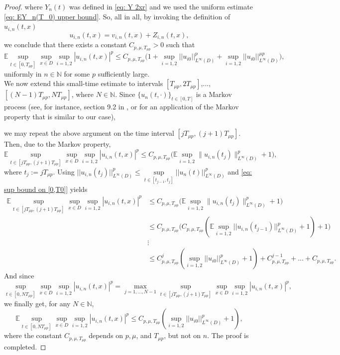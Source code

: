 \documentclass[12pt]{article}
\theoremstyle{definition}
\theoremstyle{remark}
\begin{document}
\begin{proof}
where $Y_n(t)$ was defined in \eqref{eq: Y 2xr} and we used the uniform estimate \eqref{eq: EY_n(T_0) upper bound}. So, all in all, by invoking the definition of $u_{i,n}(t,x)$
\[
u_{i,n}(t,x) = v_{i,n}(t,x) + Z_{i,n}(t,x),
\]
we conclude that there exists a constant $C_{p,\mu,T_{\mu p}}>0$ such that
\begin{equation}\label{eq: sup bound on [0,T0]}
\mathbb E\sup_{t\in [0,T_{\mu p}]}\sup_{x\in D}\sup_{i=1,2} |u_{i,n}(t,x)|^p\leq C_{p,\mu,T_{\mu p}}\Bigg(1+\sup_{i=1,2} ||u_{i0}||^p_{L^{\infty}(D)}+\sup_{i=1,2}||u_{i0}||^{\mu p}_{L^{\infty}(D)}\Bigg),
\end{equation}
uniformly in $n\in \mathbb N$ for some $p$ sufficiently large.\\[1em]
\noindent 
We now extend this small-time estimate to intervals $[T_{\mu p}, 2T_{\mu p}]$,...,$[(N-1)T_{\mu p},NT_{\mu p}]$, where $N\in \mathbb N$. Since $\{u_{n}(t,\cdot)\}_{t\in [0,T]}$ is a Markov process (see, for instance, section 9.2 in \cite{da2014stochastic}, or \cite{cerrai2003stochastic} for an application of the Markov property that is similar to our case), 

we may repeat the above argument on the time interval $[jT_{\mu p},(j+1)T_{\mu p}]$. Then, due to the Markov property,
\begin{equation*}
\mathbb{E}\sup_{t\in [jT_{\mu p},(j+1)T_{\mu p}]}\sup_{x\in D}\sup_{i=1,2}
|u_{i,n}(t,x)|^p
\le
C_{p,\mu,T_{\mu p}}\Big(\mathbb{E}\sup_{i=1,2}\|u_{i,n}(t_j)\|_{L^\infty(D)}^p+1\Big),
\end{equation*}
where $t_j := jT_{\mu p}$. Using $||u_{i,n}(t_j)||^p_{L^{\infty}(D)}\leq \sup\limits_{t\in [t_{j-1},t_{j}]} ||u_n(t)||_{L^{\infty}(D)}^p$ and \eqref{eq: sup bound on [0,T0]} yields
\begin{align*}
\mathbb{E}\sup_{t\in [jT_{\mu p},(j+1)T_{\mu p}]}\sup_{x\in D}\sup_{i=1,2}
|u_{i,n}(t,x)|^p
&\le
C_{p,\mu,T_{\mu p}}\Big(\mathbb{E}\sup_{i=1,2}\|u_{i,n}(t_j)\|_{L^\infty(D)}^p+1\Big)\\
&\leq C_{p,\mu,T_{\mu p}}\Big(C_{p,\mu,T_{\mu p}}(\mathbb E\sup_{i=1,2} ||u_{i,n}(t_{j-1})||^p_{L^{\infty}(D)}+1)+1\Big)\\
&\vdots\\
&\leq C_{p,\mu,T_{\mu p}}^j\left(\sup_{i=1,2}||u_{i0}||_{L^{\infty}(D)}^p+1\right)+ C_{p,\mu,T_{\mu p}}^{j-1} + ... + C_{p,\mu,T_{\mu p}}.
\end{align*}
And since
\[
\sup_{t\in [0,NT_{\mu p}]}\sup_{x\in D}\sup_{i=1,2} |u_{i,n}(t,x)|^p =\max\limits_{j=1,...,N-1}\sup_{t\in [jT_{\mu p},(j+1)T_{\mu p}]}\sup_{x\in D}\sup_{i=1,2} |u_{i,n}(t,x)|^p,
\]
we finally get, for any $N\in \mathbb N$,
\[\mathbb{E}\sup_{t\in [0,ΝT_{\mu p}]}\sup_{x\in D}\sup_{i=1,2}
|u_{i,n}(t,x)|^p
\leq C_{p,\mu,T_{\mu p}}\left(\sup_{i=1,2}||u_{i0}||^p_{L^{\infty}(D)}+1\right),\]
where the constant $C_{p,\mu,T_{\mu p}}$ depends on $p,\mu$, and $T_{\mu p}$, but not on $n$. The proof is completed.
\end{proof}
\end{document}

